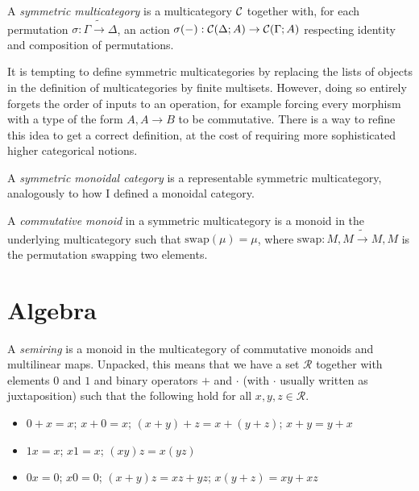 \begin{definition}
  A \emph{symmetric multicategory} is a multicategory $\mathcal C$ together with, for
  each permutation $\sigma : \Gamma \tilde\to \Delta$, an action
  $\sigma(-) : \mathcal C(\Delta; A) \to \mathcal C(\Gamma; A)$ respecting identity and
  composition of permutations.
\end{definition}

\begin{remark}
  It is tempting to define symmetric multicategories by replacing the lists of
  objects in the definition of multicategories by finite multisets.
  However, doing so entirely forgets the order of inputs to an operation, for
  example forcing every morphism with a type of the form $A, A \to B$ to be
  commutative.
  There is a way to refine this idea to get a correct definition, at the cost of
  requiring more sophisticated higher categorical notions.
\end{remark}

\begin{definition}
  A \emph{symmetric monoidal category} is a representable symmetric
  multicategory, analogously to how I defined a monoidal category.
\end{definition}

\begin{definition}
  A \emph{commutative monoid} in a symmetric multicategory is a monoid in the
  underlying multicategory such that $\mathrm{swap}(\mu) = \mu$, where
  $\mathrm{swap} : M, M \tilde\to M, M$ is the permutation swapping two
  elements.
\end{definition}

\section{Algebra}

\begin{definition}
  A \emph{semiring} is a monoid in the multicategory of commutative monoids and
  multilinear maps.
  Unpacked, this means that we have a set $\mathscr R$ together with elements
  $0$ and $1$ and binary operators $+$ and $\cdot$ (with $\cdot$ usually written
  as juxtaposition) such that the following hold for all
  $x, y, z \in \mathscr R$.
  \begin{itemize}
    \item $0 + x = x$; $x + 0 = x$; $(x + y) + z = x + (y + z)$; $x + y = y + x$
    \item $1x = x$; $x1 = x$; $(xy)z = x(yz)$
    \item $0x = 0$; $x0 = 0$; $(x + y)z = xz + yz$; $x(y + z) = xy + xz$
  \end{itemize}
\end{definition}
